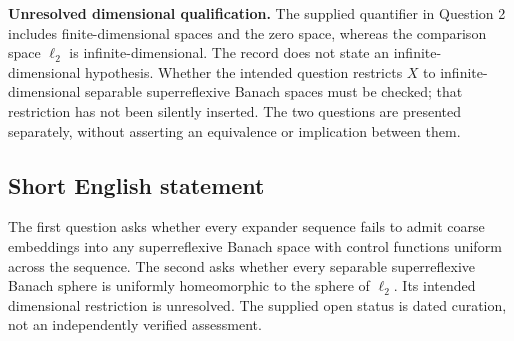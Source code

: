 \documentclass[11pt]{article}
\begin{document}
\textbf{Unresolved dimensional qualification.} The supplied quantifier in Question 2 includes finite-dimensional spaces and the zero space, whereas the comparison space \(\ell_2\) is infinite-dimensional. The record does not state an infinite-dimensional hypothesis. Whether the intended question restricts \(X\) to infinite-dimensional separable superreflexive Banach spaces must be checked; that restriction has not been silently inserted. The two questions are presented separately, without asserting an equivalence or implication between them.
\subsection{Short English statement}
The first question asks whether every expander sequence fails to admit coarse embeddings into any superreflexive Banach space with control functions uniform across the sequence. The second asks whether every separable superreflexive Banach sphere is uniformly homeomorphic to the sphere of \(\ell_2\). Its intended dimensional restriction is unresolved. The supplied open status is dated curation, not an independently verified assessment.
\end{document}
